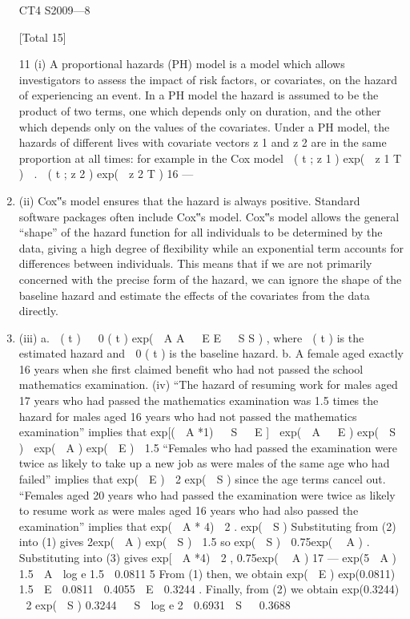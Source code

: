 \documentclass[a4paper,12pt]{article}
\begin{document}
\begin{enumerate}
CT4 S2009—8

[Total 15]

\newpage

11
(i) A proportional hazards (PH) model is a model which allows investigators to assess the impact of risk factors, or covariates, on the hazard of experiencing
an event.
In a PH model the hazard is assumed to be the product of two terms, one which depends only on duration, and the other which depends only on the
values of the covariates.
Under a PH model, the hazards of different lives with covariate vectors z 1 and
z 2 are in the same proportion at all times:
for example in the Cox model
 ( t ; z 1 ) exp(  z 1 T )

.
 ( t ; z 2 ) exp(  z 2 T )
16  — %
\item (ii) Cox‟s model ensures that the hazard is always positive. Standard software packages often include Cox‟s model.
Cox‟s model allows the general “shape” of the hazard function for all individuals to be determined by the data, giving a high degree of flexibility
while an exponential term accounts for differences between individuals.
This means that if we are not primarily concerned with the precise form of the hazard, we can ignore the shape of the baseline hazard and estimate the effects
of the covariates from the data directly.
\item (iii)
a.
 ( t )   0 ( t ) exp(  A A   E E   S S ) , where
 ( t )
is the estimated
hazard and  0 ( t ) is the baseline hazard.
b.
A female aged exactly 16 years when she first claimed benefit who had not passed the school mathematics examination.
(iv) “The hazard of resuming work for males aged 17 years who had passed the
mathematics examination was 1.5 times the hazard for males aged 16 years who had not passed the mathematics examination” implies that
exp[(  A *1)   S   E ]
 exp(  A   E )
exp(  S )
 exp(  A ) exp(  E )  1.5
“Females who had passed the examination were twice as likely to take up a new job as were males of the same age who had failed” implies that
exp(  E )
 2
exp(  S )
since the age terms cancel out.
“Females aged 20 years who had passed the examination were twice as likely to resume work as were males aged 16 years who had also passed the
examination” implies that
exp(  A * 4)
 2 .
exp(  S )
Substituting from (2) into (1) gives
2exp(  A ) exp(  S )  1.5
so
exp(  S )  0.75exp(  A ) .
Substituting into (3) gives
exp[  A *4)
 2 ,
0.75exp(  A )
17  — %
exp(5  A )  1.5
 A 
log e 1.5
 0.0811
5
From (1) then, we obtain
exp(  E ) exp(0.0811)  1.5
 E  0.0811  0.4055
 E  0.3244 .
Finally, from (2) we obtain
exp(0.3244)
 2
exp(  S )
0.3244   S  log e 2  0.6931
 S   0.3688


\end{enumerate}
\end{document}
